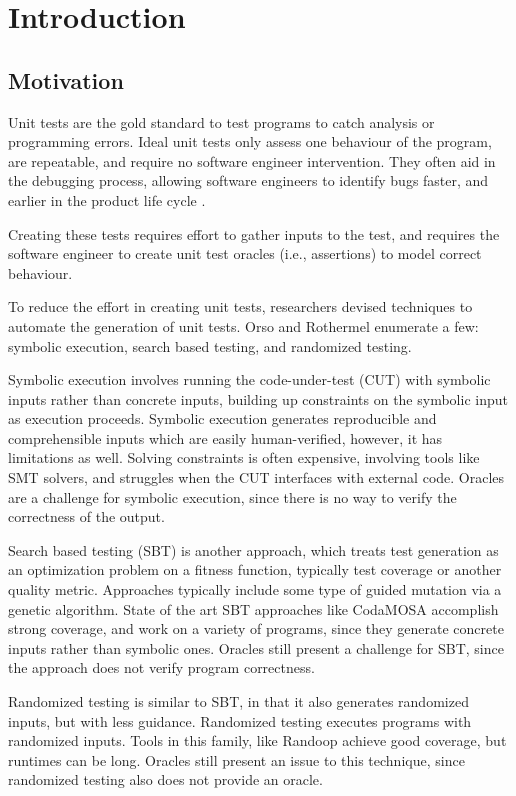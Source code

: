 \chapter{Introduction}

\section{Motivation}

Unit tests are the gold standard to test programs to catch analysis or programming errors. Ideal unit tests
only assess one behaviour of the
program, are repeatable, and require no software engineer intervention. They often aid in the debugging
process, allowing software engineers to
identify bugs faster, and earlier in the product life cycle \cite{orso2014software}.

Creating these tests requires effort to gather inputs to the test, and requires the
software engineer to create unit test oracles (i.e., assertions) to model correct behaviour.

To reduce the effort in creating unit tests, researchers devised techniques to automate
the generation of unit tests. Orso and Rothermel \cite{orso2014software}
enumerate a few: symbolic execution, search based testing, and randomized testing.

Symbolic execution involves running the code-under-test (CUT) with symbolic inputs rather
than concrete inputs, building up constraints on the symbolic input as execution proceeds.
Symbolic execution generates reproducible and comprehensible inputs which are easily
human-verified, however, it has limitations as well. Solving constraints is often expensive,
involving tools like SMT solvers, and struggles when the CUT interfaces with external code.
Oracles are a challenge for symbolic execution, since there is no way to verify the correctness
of the output.

Search based testing (SBT) is another approach, which treats test generation as an optimization problem
on a fitness function, typically test coverage or another quality metric. Approaches typically include some
type of guided mutation via a genetic algorithm.
State of the art SBT approaches like CodaMOSA \cite{lemieux2023codamosa} accomplish strong coverage, and work on
a variety of programs, since they generate concrete inputs rather than symbolic ones. Oracles still
present a challenge for SBT, since the approach does not verify program correctness.

Randomized testing is similar to SBT, in that it also generates randomized inputs, but with less guidance. Randomized
testing executes programs with randomized inputs. Tools in this family, like Randoop \cite{pacheco2007randoop}
achieve good coverage, but runtimes can be long. Oracles still present an issue to this technique, since
randomized testing also does not provide an oracle.

